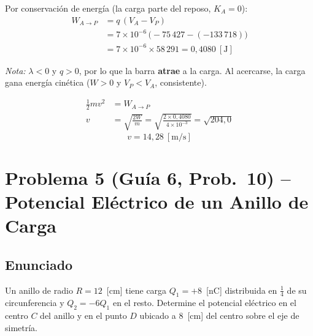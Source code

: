 \documentclass[12pt,letterpaper]{article}
\begin{document}
Por conservaci\'on de energ\'ia (la carga parte del reposo, $K_A = 0$):
\begin{align*}
    W_{A\to P} &= q\,(V_A - V_P) \\
    &= 7\times10^{-6}\,\bigl(-75\,427 - (-133\,718)\bigr) \\
    &= 7\times10^{-6} \times 58\,291 = 0{,}4080\ [\text{J}]
\end{align*}

\textit{Nota:} $\lambda < 0$ y $q > 0$, por lo que la barra \textbf{atrae} a la carga. Al acercarse,
la carga gana energ\'ia cin\'etica ($W > 0$ y $V_P < V_A$, consistente).

\begin{align*}
    \frac{1}{2}mv^2 &= W_{A\to P} \\[4pt]
    v &= \sqrt{\frac{2W}{m}} = \sqrt{\frac{2 \times 0{,}4080}{4\times10^{-3}}} = \sqrt{204{,}0}
\end{align*}
\[
    \boxed{v = 14{,}28\ [\text{m/s}]}
\]

\newpage
\section*{Problema 5 \textnormal{(Gu\'ia 6, Prob.\ 10)} -- Potencial El\'ectrico de un Anillo de Carga}

\subsection*{Enunciado}

Un anillo de radio $R = 12$~[cm] tiene carga $Q_1 = +8$~[nC] distribuida en $\tfrac{1}{4}$ de
su circunferencia y $Q_2 = -6Q_1$ en el resto. Determine el potencial el\'ectrico en el
centro $C$ del anillo y en el punto $D$ ubicado a 8~[cm] del centro sobre el eje de simetr\'ia.
\end{document}
